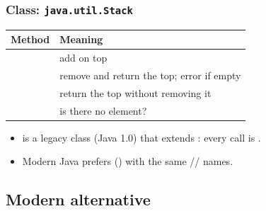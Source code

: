 \documentclass[aspectratio=169,10pt, compress]{beamer}
\begin{document}
\begin{frame}[t,fragile] \frametitle{Class: \texttt{java.util.Stack}}
  \begin{center}\small
  \begin{tabular}{lL{0.55\textwidth}}
    \toprule
    \textbf{Method} & \textbf{Meaning} \\
    \midrule
       & add on top \\
              & remove and return the top; error if empty \\
             & return the top without removing it \\
          & is there no element? \\
    \bottomrule
  \end{tabular}
  \end{center}
  \vspace{0.3em}
  \begin{itemize}\small
    \item {} is a legacy class (Java 1.0) that extends
          : every call is .
    \item Modern Java prefers  ()
          with the same // names.
  \end{itemize}
\end{frame}

\subsection[Modern]{Modern alternative}
\end{document}

